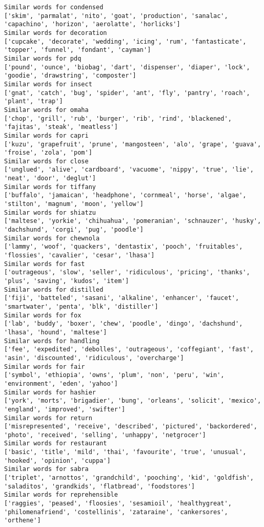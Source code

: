 \documentclass[11pt]{article}
\begin{document}
\begin{Verbatim}[commandchars=\\\{\}]
Similar words for condensed
['skim', 'parmalat', 'nito', 'goat', 'production', 'sanalac', 'capachino', 'horizon', 'aerolatte', 'horlicks']
Similar words for decoration
['cupcake', 'decorate', 'wedding', 'icing', 'rum', 'fantasticate', 'topper', 'funnel', 'fondant', 'cayman']
Similar words for pdq
['pound', 'ounce', 'biobag', 'dart', 'dispenser', 'diaper', 'lock', 'goodie', 'drawstring', 'composter']
Similar words for insect
['gnat', 'catch', 'bug', 'spider', 'ant', 'fly', 'pantry', 'roach', 'plant', 'trap']
Similar words for omaha
['chop', 'grill', 'rub', 'burger', 'rib', 'rind', 'blackened', 'fajitas', 'steak', 'meatless']
Similar words for capri
['kuzu', 'grapefruit', 'prune', 'mangosteen', 'alo', 'grape', 'guava', 'froise', 'zola', 'pom']
Similar words for close
['unglued', 'alive', 'cardboard', 'vacuome', 'nippy', 'true', 'lie', 'neat', 'door', 'deglut']
Similar words for tiffany
['buffalo', 'jamaican', 'headphone', 'cornmeal', 'horse', 'algae', 'stilton', 'magnum', 'moon', 'yellow']
Similar words for shiatzu
['maltese', 'yorkie', 'chihuahua', 'pomeranian', 'schnauzer', 'husky', 'dachshund', 'corgi', 'pug', 'poodle']
Similar words for chewnola
['lammy', 'woof', 'quackers', 'dentastix', 'pooch', 'fruitables', 'flossies', 'cavalier', 'cesar', 'lhasa']
Similar words for fast
['outrageous', 'slow', 'seller', 'ridiculous', 'pricing', 'thanks', 'plus', 'saving', 'kudos', 'item']
Similar words for distilled
['fiji', 'batteled', 'sasani', 'alkaline', 'enhancer', 'faucet', 'smartwater', 'penta', 'blk', 'distiller']
Similar words for fox
['lab', 'buddy', 'boxer', 'chew', 'poodle', 'dingo', 'dachshund', 'lhasa', 'hound', 'maltese']
Similar words for handling
['fee', 'expedited', 'debolles', 'outrageous', 'coffegiant', 'fast', 'asin', 'discounted', 'ridiculous', 'overcharge']
Similar words for fair
['symbol', 'ethiopia', 'owns', 'plum', 'non', 'peru', 'win', 'environment', 'eden', 'yahoo']
Similar words for hashier
['york', 'morts', 'brigadier', 'bung', 'orleans', 'solicit', 'mexico', 'england', 'improved', 'swifter']
Similar words for return
['misrepresented', 'receive', 'described', 'pictured', 'backordered', 'photo', 'received', 'selling', 'unhappy', 'netgrocer']
Similar words for restaurant
['basic', 'title', 'mild', 'thai', 'favourite', 'true', 'unusual', 'hooked', 'opinion', 'cuppa']
Similar words for sabra
['triplet', 'arnottos', 'grandchild', 'pooching', 'kid', 'goldfish', 'saladitos', 'grandkids', 'flatbread', 'foodstores']
Similar words for reprehensible
['raggies', 'peased', 'floosies', 'sesamioil', 'healthygreat', 'philomenafriend', 'costellinis', 'zataraine', 'cankersores', 'orthene']

\end{Verbatim}
\end{document}
